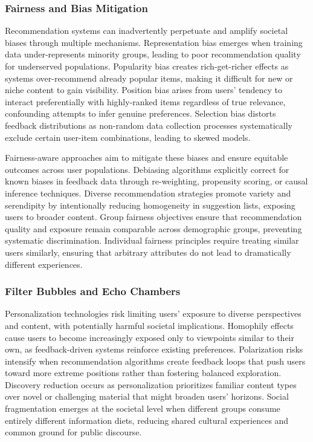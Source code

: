 \subsubsection{Fairness and Bias Mitigation}

Recommendation systems can inadvertently perpetuate and amplify societal biases through multiple mechanisms. Representation bias emerges when training data under-represents minority groups, leading to poor recommendation quality for underserved populations. Popularity bias creates rich-get-richer effects as systems over-recommend already popular items, making it difficult for new or niche content to gain visibility. Position bias arises from users' tendency to interact preferentially with highly-ranked items regardless of true relevance, confounding attempts to infer genuine preferences. Selection bias distorts feedback distributions as non-random data collection processes systematically exclude certain user-item combinations, leading to skewed models.

Fairness-aware approaches aim to mitigate these biases and ensure equitable outcomes across user populations. Debiasing algorithms explicitly correct for known biases in feedback data through re-weighting, propensity scoring, or causal inference techniques. Diverse recommendation strategies promote variety and serendipity by intentionally reducing homogeneity in suggestion lists, exposing users to broader content. Group fairness objectives ensure that recommendation quality and exposure remain comparable across demographic groups, preventing systematic discrimination. Individual fairness principles require treating similar users similarly, ensuring that arbitrary attributes do not lead to dramatically different experiences.

\subsubsection{Filter Bubbles and Echo Chambers}

Personalization technologies risk limiting users' exposure to diverse perspectives and content, with potentially harmful societal implications. Homophily effects cause users to become increasingly exposed only to viewpoints similar to their own, as feedback-driven systems reinforce existing preferences. Polarization risks intensify when recommendation algorithms create feedback loops that push users toward more extreme positions rather than fostering balanced exploration. Discovery reduction occurs as personalization prioritizes familiar content types over novel or challenging material that might broaden users' horizons. Social fragmentation emerges at the societal level when different groups consume entirely different information diets, reducing shared cultural experiences and common ground for public discourse.

